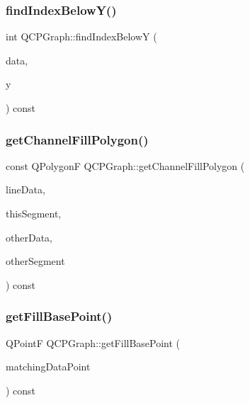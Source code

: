 \mbox{\label{class_q_c_p_graph_a5b0291f248e8ca8eaa82833ab420dcd0}} 
\subsubsection{\texorpdfstring{findIndexBelowY()}{findIndexBelowY()}}
{\footnotesize\ttfamily int Q\+C\+P\+Graph\+::find\+Index\+BelowY (\begin{DoxyParamCaption}\item[{const Q\+Vector$<$ Q\+PointF $>$ $\ast$}]{data,  }\item[{double}]{y }\end{DoxyParamCaption}) const\hspace{0.3cm}{\ttfamily [protected]}}

\mbox{\label{class_q_c_p_graph_a9a5bdd5cb695d95d3eea80cfe96c5118}} 
\subsubsection{\texorpdfstring{getChannelFillPolygon()}{getChannelFillPolygon()}}
{\footnotesize\ttfamily const Q\+PolygonF Q\+C\+P\+Graph\+::get\+Channel\+Fill\+Polygon (\begin{DoxyParamCaption}\item[{const Q\+Vector$<$ Q\+PointF $>$ $\ast$}]{line\+Data,  }\item[{\mbox{\hyperlink{class_q_c_p_data_range}{Q\+C\+P\+Data\+Range}}}]{this\+Segment,  }\item[{const Q\+Vector$<$ Q\+PointF $>$ $\ast$}]{other\+Data,  }\item[{\mbox{\hyperlink{class_q_c_p_data_range}{Q\+C\+P\+Data\+Range}}}]{other\+Segment }\end{DoxyParamCaption}) const\hspace{0.3cm}{\ttfamily [protected]}}

\mbox{\label{class_q_c_p_graph_a13f2c756f3114703159c2e604783e208}} 
\subsubsection{\texorpdfstring{getFillBasePoint()}{getFillBasePoint()}}
{\footnotesize\ttfamily Q\+PointF Q\+C\+P\+Graph\+::get\+Fill\+Base\+Point (\begin{DoxyParamCaption}\item[{Q\+PointF}]{matching\+Data\+Point }\end{DoxyParamCaption}) const\hspace{0.3cm}{\ttfamily [protected]}}

